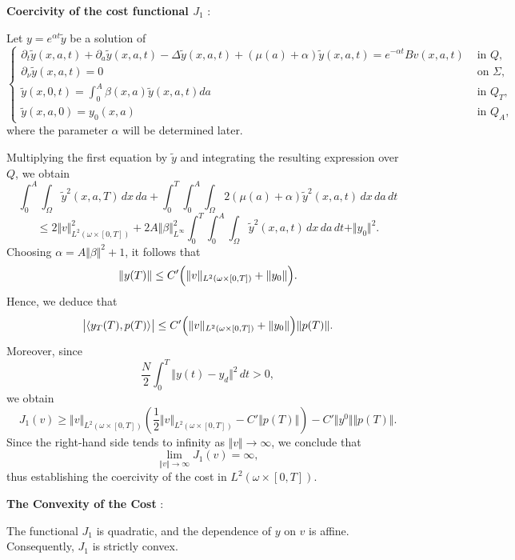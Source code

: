 \documentclass[10pt, a4]{amsart}
\makeatletter
\theoremstyle{plain}
\theoremstyle{definition}
\theoremstyle{remark}
\renewenvironment{proof}[1][\proofname]{\par
  \pushQED{\qed}%
  \normalfont \topsep6\p@\@plus6\p@\relax
  \trivlist
  \item[\hskip\labelsep
        \itshape
    #1\ \ref{#1}.]\ignorespaces
}{%
  \popQED\endtrivlist\@endpefalse
}
\numberwithin{equation}{section}
\def\to{\rightarrow}
\makeatother
\begin{document}
\begin{proof}[of Proposition \ref{pr3.1}]
{\bf Coercivity of the cost functional $J_1$
}:

Let $y = e^{\alpha t}\tilde{y}$ be a solution of
\begin{equation}\label{eq3.7}	 
\left\lbrace
\begin{array}{ll}
\partial_{t}\tilde{y}(x,a,t) + \partial_{a}\tilde{y}(x,a,t) - \Delta \tilde{y}(x,a,t) + (\mu(a)+\alpha)\tilde{y}(x,a,t) = e^{-\alpha t}Bv(x,a,t) & \text{ in } Q,\\[1mm]
\partial_{\nu}\tilde{y}(x,a,t)=0 & \text{ on } \Sigma,\\[1mm]
\tilde{y}(x,0,t)=\displaystyle\int_{0}^{A}\beta(x,a)\tilde{y}(x,a,t)da & \text{ in } Q_{T},\\[1mm]
\tilde{y}(x,a,0)= y_{0}(x,a) & \text{ in } Q_A,
\end{array}
\right.
\end{equation}
where the parameter \(\alpha\) will be determined later.

Multiplying the first equation by \(\tilde{y}\) and integrating the resulting expression over \(Q\), we obtain
\[
\int_{0}^{A}\int_{\Omega}\tilde{y}^2(x,a,T)\,dx\,da + \int_{0}^{T}\int_{0}^{A}\int_{\Omega}2(\mu(a)+\alpha)\tilde{y}^2(x,a,t)\,dx\,da\,dt
\]
\[
\leq 2\Vert v\Vert^2_{L^2(\omega\times[0,T])} + 2A\Vert \beta\Vert^2_{L^\infty}\int_{0}^{T}\int_{0}^{A}\int_{\Omega}\tilde{y}^2(x,a,t)\,dx\,da\,dt + \Vert y_0\Vert^2.
\]
Choosing \(\alpha = A\Vert \beta\Vert^2 + 1\), it follows that
\begin{align}\label{eq3.8}
    \Vert y(T)\Vert \leq C'\Bigl(\Vert v\Vert_{L^2(\omega\times[0,T])} + \Vert y_0\Vert\Bigr).
\end{align}
Hence, we deduce that
\[
\bigl|\langle y_T(T),p(T)\rangle\bigr| \leq C'\Bigl(\Vert v\Vert_{L^2(\omega\times[0,T])} + \Vert y_0\Vert\Bigr)\Vert p(T)\Vert.
\]
Moreover, since
\[
\frac{N}{2}\int_{0}^{T}\Vert y(t)-y_d\Vert^2\,dt > 0,
\]
we obtain
\[
J_1(v) \geq \Vert v\Vert_{L^2(\omega\times[0,T])}\left(\frac{1}{2}\Vert v\Vert_{L^2(\omega\times[0,T])} - C'\Vert p(T)\Vert\right) - C'\Vert y^0\Vert\Vert p(T)\Vert.
\]
Since the right-hand side tends to infinity as \(\Vert v\Vert \to \infty\), we conclude that
\[
\lim_{\Vert v\Vert \to \infty}J_1(v)=\infty,
\]
thus establishing the coercivity of the cost in \(L^2(\omega\times[0,T])\).

{\bf The Convexity of the Cost} :

The functional \(J_1\) is quadratic, and the dependence of \(y\) on \(v\) is affine. Consequently, \(J_1\) is strictly convex.


\end{proof}
\end{document}
